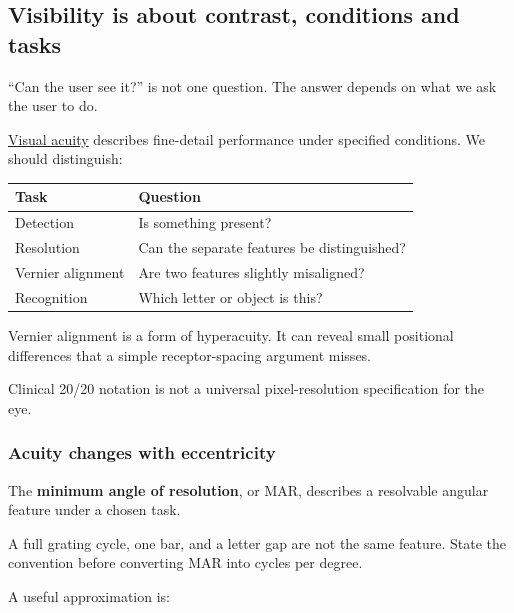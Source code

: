\subsection{Visibility is about contrast, conditions and tasks}\label{04-visual-computing-ii-ch043-visibility-is-about-contrast-conditions-and-tasks}

\hypertarget{04-visual-computing-ii-ch043-visibility-is-about-contrast-conditions-and-tasks}{}

``Can the user see it?'' is not one question. The answer depends on what we ask the user to do.

\hyperref[appendix-b491fc48c54b]{Visual acuity} describes fine-detail performance under specified conditions. We should distinguish:

{\def\LTcaptype{none} %
\begin{longtable}[]{@{}ll@{}}
\toprule\noalign{}
Task & Question \\
\midrule\noalign{}
\endhead
\bottomrule\noalign{}
\endlastfoot
Detection & Is something present? \\
Resolution & Can the separate features be distinguished? \\
Vernier alignment & Are two features slightly misaligned? \\
Recognition & Which letter or object is this? \\
\end{longtable}
}

Vernier alignment is a form of hyperacuity. It can reveal small positional differences that a simple receptor-spacing argument misses.

Clinical 20/20 notation is not a universal pixel-resolution specification for the eye.

\subsubsection{Acuity changes with eccentricity}\label{04-visual-computing-ii-ch043-acuity-changes-with-eccentricity}

\hypertarget{04-visual-computing-ii-ch043-acuity-changes-with-eccentricity}{}

The \textbf{minimum angle of resolution}, or MAR, describes a resolvable angular feature under a chosen task.

A full grating cycle, one bar, and a letter gap are not the same feature. State the convention before converting MAR into cycles per degree.

A useful approximation is:

